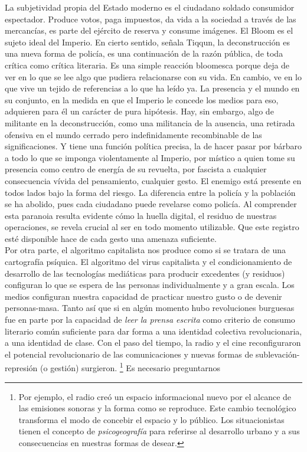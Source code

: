 \documentclass[
]{article}
\begin{document}
La subjetividad propia del Estado moderno es el ciudadano soldado
consumidor espectador. Produce votos, paga impuestos, da vida a la
sociedad a través de las mercancías, es parte del ejército de reserva y
consume imágenes. El Bloom es el sujeto ideal del Imperio. En cierto
sentido, señala Tiqqun, la deconstrucción es una nueva forma de policía,
es una continuación de la razón pública, de toda crítica como crítica
literaria. Es una simple reacción bloomesca porque deja de ver en lo que
se lee algo que pudiera relacionarse con su vida. En cambio, ve en lo
que vive un tejido de referencias a lo que ha leído ya. La presencia y
el mundo en su conjunto, en la medida en que el Imperio le concede los
medios para eso, adquieren para él un carácter de pura hipótesis. Hay,
sin embargo, algo de militante en la deconstrucción, como una militancia
de la ausencia, una retirada ofensiva en el mundo cerrado pero
indefinidamente recombinable de las significaciones. Y tiene una función
política precisa, la de hacer pasar por bárbaro a todo lo que se imponga
violentamente al Imperio, por místico a quien tome su presencia como
centro de energía de su revuelta, por fascista a cualquier consecuencia
vívida del pensamiento, cualquier gesto. El enemigo está presente en
todos lados bajo la forma del riesgo. La diferencia entre la policía y
la población se ha abolido, pues cada ciudadano puede revelarse como
policía. Al comprender esta paranoia resulta evidente cómo la huella
digital, el residuo de nuestras operaciones, se revela crucial al ser en
todo momento utilizable. Que este registro esté disponible hace de cada
gesto una amenaza suficiente.\\
Por otra parte, el algoritmo capitalista nos produce como si se tratara
de una cartografía psíquica. El algoritmo del virus capitalista y el
condicionamiento de desarrollo de las tecnologías mediáticas para
producir excedentes (y residuos) configuran lo que se espera de las
personas individualmente y a gran escala. Los medios configuran nuestra
capacidad de practicar nuestro gusto o de devenir personas-masa. Tanto
así que si en algún momento hubo revoluciones burguesas fue en parte por
la capacidad de \emph{leer la prensa escrita} como criterio de consumo
literario común suficiente para dar forma a una identidad colectiva
revolucionaria, a una identidad de clase. Con el paso del tiempo, la
radio y el cine reconfiguraron el potencial revolucionario de las
comunicaciones y nuevas formas de sublevación-represión (o gestión)
surgieron. \footnote{Por ejemplo, el radio creó un espacio informacional
  nuevo por el alcance de las emisiones sonoras y la forma como se
  reproduce. Este cambio tecnológico transforma el modo de concebir el
  espacio y lo público. Los situacionistas tienen el concepto de
  \emph{psicogeografía} para referirse al desarrollo urbano y a sus
  consecuencias en nuestras formas de desear.} Es necesario preguntarnos
\end{document}

